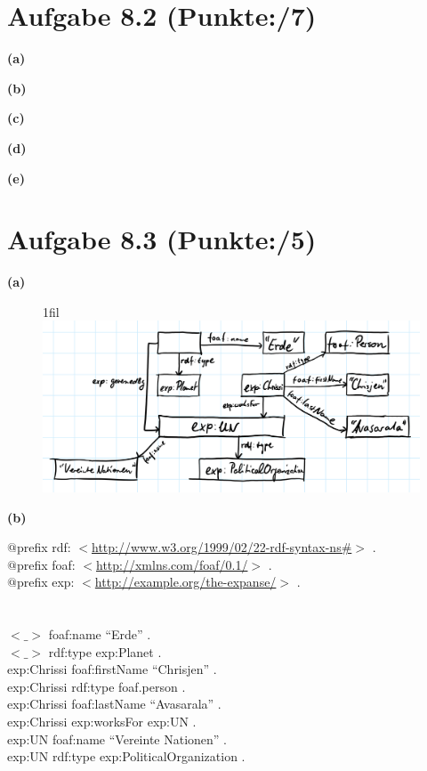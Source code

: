 \documentclass[11pt, a4paper]{article}
\makeatletter
\newcommand{\blattnummer}{8}
\newcommand{\pp}{7}
\newcommand{\ppp}{5}
\newcommand*{\centerfloat}{%
  \parindent \z@
  \leftskip \z@ \@plus 1fil \@minus \textwidth
  \rightskip\leftskip
  \parfillskip \z@skip}
\newcommand{\aufgabe}[2] {\section*{Aufgabe \blattnummer.#1 (Punkte:\qquad/#2)}}
\newcommand{\aufgabenteil}[1] {\textbf{(#1)}}
\makeatother
\begin{document}
\aufgabe{2}{\pp}
\aufgabenteil{a}
\begin{adjustwidth}{20pt}{20pt}

\end{adjustwidth}
\aufgabenteil{b}
\begin{adjustwidth}{20pt}{20pt}

\end{adjustwidth}
\aufgabenteil{c}
\begin{adjustwidth}{20pt}{20pt}

\end{adjustwidth}
\aufgabenteil{d}
\begin{adjustwidth}{20pt}{20pt}

\end{adjustwidth}
\aufgabenteil{e}
\begin{adjustwidth}{20pt}{20pt}

\end{adjustwidth}



\aufgabe{3}{\ppp}
\aufgabenteil{a}
\begin{figure}[h]
\centerfloat
\includegraphics[page=1,scale=0.5]{u08-3-a.png}
\end{figure}
\newpage
\aufgabenteil{b}
\begin{adjustwidth}{20pt}{20pt}
$@$prefix rdf: $<$\url{http://www.w3.org/1999/02/22-rdf-syntax-ns\#}$>$ .\\
$@$prefix foaf: $<$\url{http://xmlns.com/foaf/0.1/}$>$ .\\
$@$prefix exp: $<$\url{http://example.org/the-expanse/}$>$ .\\
\\ \ \\
$<\_>$ foaf:name ``Erde'' .\\
$<\_>$ rdf:type exp:Planet .\\
exp:Chrissi foaf:firstName ``Chrisjen'' .\\
exp:Chrissi rdf:type foaf.person .\\
exp:Chrissi foaf:lastName ``Avasarala'' .\\
exp:Chrissi exp:worksFor exp:UN .\\
exp:UN foaf:name ``Vereinte Nationen'' .\\
exp:UN rdf:type exp:PoliticalOrganization .\\
\end{adjustwidth}

\end{document}
